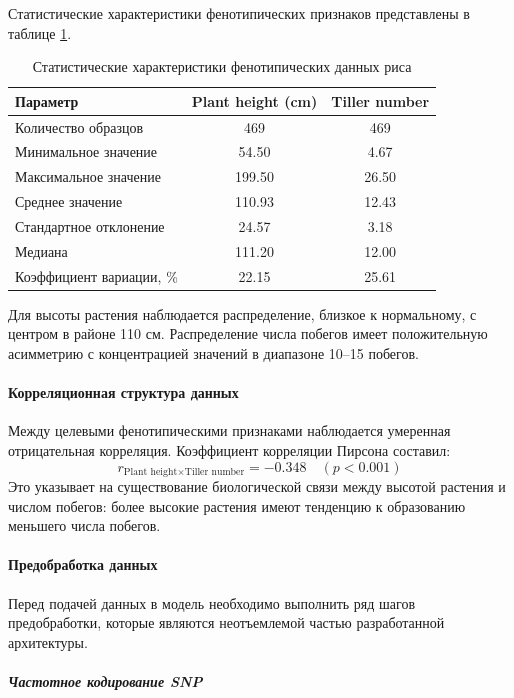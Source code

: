 Статистические характеристики фенотипических признаков представлены в таблице \ref{tab:rice_stats}.

\begin{table}[h]
	\centering
	\caption{Статистические характеристики фенотипических данных риса}
	\label{tab:rice_stats}
	\begin{tabular}{|l|c|c|}
		\hline
		\textbf{Параметр} & \textbf{Plant height (cm)} & \textbf{Tiller number} \\ \hline
		Количество образцов & 469 & 469 \\ \hline
		Минимальное значение & 54.50 & 4.67 \\ \hline
		Максимальное значение & 199.50 & 26.50 \\ \hline
		Среднее значение & 110.93 & 12.43 \\ \hline
		Стандартное отклонение & 24.57 & 3.18 \\ \hline
		Медиана & 111.20 & 12.00 \\ \hline
		Коэффициент вариации, \% & 22.15 & 25.61 \\ \hline
	\end{tabular}
\end{table}

Для высоты растения наблюдается распределение, близкое к нормальному, с центром в районе 110 см. Распределение числа побегов имеет положительную асимметрию с концентрацией значений в диапазоне 10--15 побегов.

\paragraph{Корреляционная структура данных}

Между целевыми фенотипическими признаками наблюдается умеренная отрицательная корреляция. Коэффициент корреляции Пирсона составил:
\[
r_{\text{Plant height} \times \text{Tiller number}} = -0.348 \quad (p < 0.001)
\]
Это указывает на существование биологической связи между высотой растения и числом побегов: более высокие растения имеют тенденцию к образованию меньшего числа побегов.

\paragraph{Предобработка данных}

Перед подачей данных в модель необходимо выполнить ряд шагов предобработки, которые являются неотъемлемой частью разработанной архитектуры.

\subparagraph{Частотное кодирование SNP}

